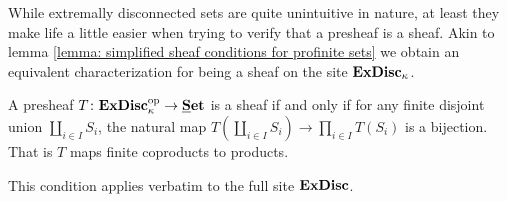 While extremally disconnected sets are quite unintuitive in nature, at least they make life a little easier when trying to verify that a presheaf is a sheaf. Akin to lemma \ref{lemma: simplified sheaf conditions for profinite sets} we obtain an equivalent characterization for being a sheaf on the site ${\mathbf{ExDisc}}_{\kappa}$.
\begin{lemma}
	\label{lemma: simplified sheaf condition for extremally disconnected sets}
	
	A presheaf $T\colon {\mathbf{ExDisc}}_{\kappa}^{\mathrm{op}} \to {{\mathbf{\underline{S}et}}}$ is a sheaf if and only if for any finite disjoint union $\coprod_{i\in I} S_i$, the natural map $T(\coprod_{i\in I} S_i)\to \prod_{i\in I} T(S_i)$ is a bijection. That is $T$ maps finite coproducts to products.
	
	This condition applies verbatim to the full site ${\mathbf{ExDisc}}$.
\end{lemma}

